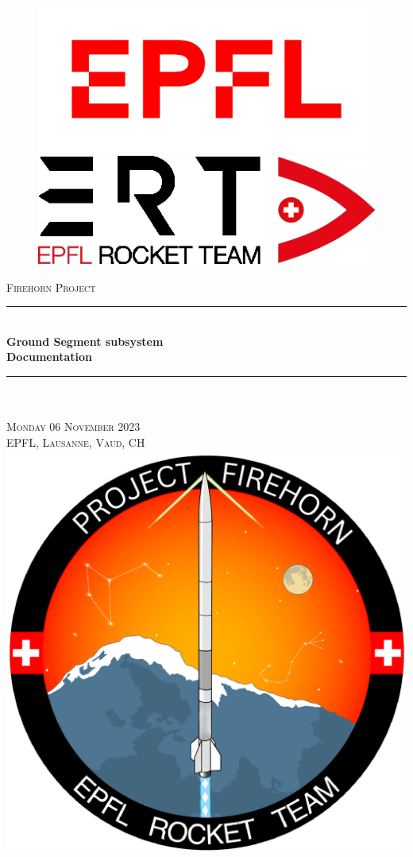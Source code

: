 \begin{titlepage}

    \newcommand{\HRule}{\rule{\linewidth}{0.5mm}} %
    \centering %
    
    \begin{figure}[!htb]
        \begin{minipage}{0.48\textwidth}
            \centering
            \includegraphics[width=.6\linewidth]{images/logo/EPFL.jpg}
        \end{minipage}\hfill
        \begin{minipage}{0.48\textwidth}
            \centering
            \includegraphics[width=.6\linewidth]{images/logo/ERT.png}
        \end{minipage}
    \end{figure}
    \vspace*{1cm}
    \textsc{\LARGE Firehorn Project}\\[1cm]
    \HRule\\[0.5cm]
    { \huge \bfseries Ground Segment subsystem}\\[0.2cm] 
    { \huge \bfseries Documentation}\\[0.2cm] 
    \HRule\\
    \textsc{\LARGE }\\[0.5 cm]
    
    \textsc{\large Monday 06 November 2023}\\[0.2cm]
    \textsc{\large EPFL, Lausanne, Vaud, CH}\\[1.2cm]
    
    \includegraphics[width=0.6\linewidth]{images/logo/FIREHORN.png}\\[1cm]

\end{titlepage}